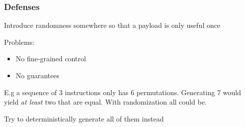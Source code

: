 \begin{frame}
	\frametitle{Defenses}

	Introduce randomness somewhere so that a payload is only useful once

	\vspace{0.5cm}

	Problems:
	\begin{itemize}
		\item No fine-grained control
		\item No guarantees
	\end{itemize}

	\vspace{0.5cm}

	E.g a sequence of 3 instructions only has 6 permutations. Generating 7 would yield 
	\textit{at least} two that are equal. With randomization all could be.
	\vspace{0.5cm}

	Try to deterministically generate all of them instead
\end{frame}

